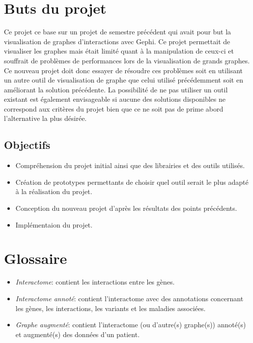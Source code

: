 \documentclass{article}
\begin{document}
\section{Buts du projet}
  Ce projet ce base sur un projet de semestre précédent qui avait pour but la visualisation de graphes d'interactions avec Gephi. Ce projet permettait de visualiser les graphes mais était limité quant à la manipulation de ceux-ci et souffrait de problèmes de performances lors de la visualisation de grands graphes.\\
  Ce nouveau projet doit donc essayer de résoudre ces problèmes soit en utilisant un autre outil de visualisation de graphe que celui utilisé précédemment soit en améliorant la solution précédente. La possibilité de ne pas utiliser un outil existant est également envisageable si aucune des solutions disponibles ne correspond aux critères du projet bien que ce ne soit pas de prime abord l'alternative la plus désirée.
  \subsection{Objectifs}
  \begin{itemize}
    \item Compréhension du projet initial ainsi que des librairies et des outils utilisés.
    \item Création de prototypes permettants de choisir quel outil serait le plus adapté à la réalisation du projet.
    \item Conception du nouveau projet d'après les résultats des points précédents.
    \item Implémentaion du projet.
  \end{itemize}

\section{Glossaire}
  \begin{itemize}
    \item \textit{Interactome}: contient les interactions entre les gènes.
    \item \textit{Interactome annoté}: contient l'interactome avec des annotations concernant les gènes, les interactions, les variants et les maladies associées.
    \item \textit{Graphe augmenté}: contient l'interactome (ou d'autre(s) graphe(s)) annoté(s) et augmenté(s) des données d'un patient.
  \end{itemize}
\cite{Sisto:2014}
\end{document}
